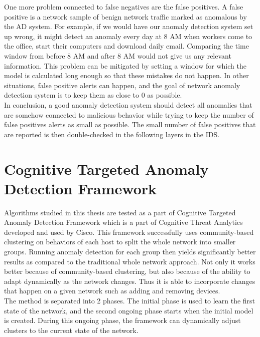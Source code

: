\documentclass[thesis=B,english]{FITthesis}[2012/10/20]
\begin{document}
One more problem connected to false negatives are the false positives.
A false positive is a network sample of benign network traffic marked as anomalous by the AD system.
For example, if we would have our anomaly detection system set up wrong, it might detect an anomaly every day at 8 AM when workers come to the office, start their computers and download daily email.
Comparing the time window from before 8 AM and after 8 AM would not give us any relevant information.
This problem can be mitigated by setting a window for which the model is calculated long enough so that these mistakes do not happen.
In other situations, false positive alerts can happen, and the goal of network anomaly detection system is to keep them as close to 0 as possible. \\

In conclusion, a good anomaly detection system should detect all anomalies that are somehow connected to malicious behavior while trying to keep the number of false positives alerts as small as possible.
The small number of false positives that are reported is then double-checked in the following layers in the IDS.

\section{Cognitive Targeted Anomaly Detection Framework}

Algorithms studied in this thesis are tested as a part of Cognitive Targeted Anomaly Detection Framework which is a part of Cognitive Threat Analytics developed and used by Cisco.
This framework successfully uses community-based clustering on behaviors of each host to split the whole network into smaller groups.
Running anomaly detection for each group then yields significantly better results as compared to the traditional whole network approach.
Not only it works better because of community-based clustering, but also because of the ability to adapt dynamically as the network changes.
Thus it is able to incorporate changes that happen on a given network such as adding and removing devices.\\

The method is separated into 2 phases.
The initial phase is used to learn the first state of the network, and the second ongoing phase starts when the initial model is created.
During this ongoing phase, the framework can dynamically adjust clusters to the current state of the network. \\
\end{document}
